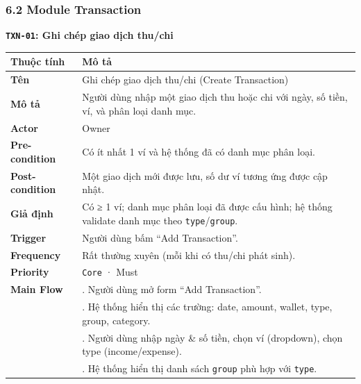 \documentclass[11pt,a4paper]{article}
\newcounter{none}
\newcommand{\faintline}{\noalign{\global\arrayrulecolor{faintgray}}\hline\noalign{\global\arrayrulecolor{black}}} %
\begin{document}
\subsubsection{6.2 Module Transaction}\label{module-transaction}

\textbf{\texttt{TXN-01}: Ghi chép giao dịch thu/chi}

{\def\LTcaptype{none}
\begin{longtable}[]{@{}
  >{\raggedright\arraybackslash}p{}
  >{\raggedright\arraybackslash}p{}@{}}
\toprule\noalign{}
\begin{minipage}[b]{\linewidth}\raggedright
Thuộc tính
\end{minipage} & \begin{minipage}[b]{\linewidth}\raggedright
Mô tả
\end{minipage} \\
\midrule\noalign{}
\endhead
\bottomrule\noalign{}
\endlastfoot
\textbf{Tên} & Ghi chép giao dịch thu/chi (Create Transaction) \\ \faintline
\textbf{Mô tả} & Người dùng nhập một giao dịch thu hoặc chi với ngày, số tiền, ví, và phân loại danh mục. \\ \faintline
\textbf{Actor} & Owner \\ \faintline
\textbf{Pre-condition} & Có ít nhất 1 ví và hệ thống đã có danh mục phân loại. \\ \faintline
\textbf{Post-condition} & Một giao dịch mới được lưu, số dư ví tương ứng được cập nhật. \\ \faintline
\textbf{Giả định} & Có ≥ 1 ví; danh mục phân loại đã được cấu hình; hệ thống validate danh mục theo \texttt{type}/\texttt{group}. \\ \faintline
\textbf{Trigger} & Người dùng bấm ``Add Transaction''. \\ \faintline
\textbf{Frequency} & Rất thường xuyên (mỗi khi có thu/chi phát sinh). \\ \faintline
\textbf{Priority} & \texttt{Core} · Must \\ \faintline
\textbf{Main Flow} & 1. Người dùng mở form ``Add Transaction''.\\
&2. Hệ thống hiển thị các trường: date, amount, wallet, type, group, category.\\
&3. Người dùng nhập ngày \& số tiền, chọn ví (dropdown), chọn type (income/expense).\\
&4. Hệ thống hiển thị danh sách \texttt{group} phù hợp với \texttt{type}.\\

\end{longtable}}
\end{document}
